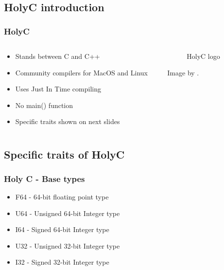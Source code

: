 \documentclass{beamer}
\begin{document}
	\subsection{HolyC introduction}
	\begin{frame}
		\frametitle{HolyC}
		\begin{columns}
			\begin{column}{0.6\textwidth}
				\begin{itemize}
					\item Stands between C and C++

					\item Community compilers for MacOS and Linux

					\item Uses Just In Time compiling

					\item No main() function

					\item Specific traits shown on next slides
				\end{itemize}
			\end{column}
			\begin{column}{0.4\textwidth}
				\begin{figure}
					\centering
					
					\caption{HolyC logo}
					\label{fig:HolyC_logo}
				\end{figure}
				Image by \cite{1ctinus_english_2020}.
			\end{column}
		\end{columns}
	\end{frame}

	\subsection{Specific traits of HolyC}
	\begin{frame}
		\frametitle{Holy C - Base types}
		\begin{itemize}
			\item F64 - 64-bit floating point type

			\item U64 - Unsigned 64-bit Integer type

			\item I64 - Signed 64-bit Integer type

			\item U32 - Unsigned 32-bit Integer type

			\item I32 - Signed 32-bit Integer type
		\end{itemize}
	\end{frame}
\end{document}
